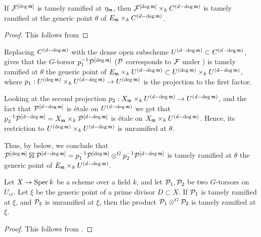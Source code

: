 \begin{lemma}\label{lemma:tame_ramification_persists}
     If $\mathcal{F}^{[\deg \mathfrak{m}]}$ is tamely ramified at $\eta_{\mathfrak{m}}$, then
     $\mathcal{F}^{[\deg \mathfrak{m}]} \times_k C^{(d-\deg \mathfrak{m})}$ is tamely ramified at the generic point $\theta$ of
     $E_{\mathfrak{m}} \times_k C^{(d-\deg \mathfrak{m})}$.
\end{lemma}
\begin{proof}
    This follows from 
\end{proof}


Replacing $C^{(d - \deg \mathfrak{m})}$ with the dense open subscheme $U^{(d - \deg \mathfrak{m})} \subset C^{(d - \deg \mathfrak{m})}$,
 gives that the $G$-torsor $p_1^{-1} \mathcal{P}^{[\deg \mathfrak{m}]}$ ($\mathcal{P}$ corresponds to $\mathcal{F}$ under )
is tamely ramified at $\theta$ the generic point of
$E_{\mathfrak{m}} \times_k U^{(d-\deg \mathfrak{m})} \subset U^{(\deg \mathfrak{m})} \times_k U^{(d - \deg \mathfrak{m})}$,
where $p_1: U^{(\deg \mathfrak{m})} \times_k U^{(d - \deg \mathfrak{m})} \to U^{(\deg \mathfrak{m})}$ is the projection to the first factor.

Looking at the second projection $p_2:X_{\mathfrak{m}} \times_k U^{(d - \deg \mathfrak{m})} \to U^{(d - \deg \mathfrak{m})}$, and the fact that
$\mathcal{P}^{[d - \deg \mathfrak{m}]}$ is \'etale on $U^{(d - \deg \mathfrak{m})}$ we get that
$p_2^{-1} \mathcal{P}^{[d - \deg \mathfrak{m}]}= X_{\mathfrak{m}} \times_k \mathcal{P}^{[d - \deg \mathfrak{m}]}$ is \'etale on $X_{\mathfrak{m}} \times_k U^{(d - \deg \mathfrak{m})}$.
Hence, its restriction to $U^{(\deg \mathfrak{m})} \times_k U^{(d - \deg \mathfrak{m})}$ is unramified at $\theta$.

Thus, by  below, we conclude that ${\mathcal{P}^{[\deg \mathfrak{m}]}} \boxtimes \mathcal{P}^{[d - \deg \mathfrak{m}]} = p_1^{-1} \mathcal{P}^{[\deg \mathfrak{m}]} \otimes^G p_2^{-1} \mathcal{P}^{[d - \deg \mathfrak{m}]}$
     is tamely ramified at $\theta$ the generic point of $E_{\mathfrak{m}} \times_k U^{(d-\deg \mathfrak{m})}$.

\begin{lemma}\label{lemma:tame_times_unramified}
     Let $X \to \operatorname{Spec} k$ be a scheme over a field $k$, and let $\mathcal{P}_1, \mathcal{P}_2$ be two $G$-torsors on $U_{et}$.
     Let $\xi$ be the generic point of a prime divisor $D \subset X$.
     If $\mathcal{P}_1$ is tamely ramified at $\xi$, and $\mathcal{P}_2$ is unramified at $\xi$,
     then the product $\mathcal{P}_1 \otimes^G \mathcal{P}_2$ is tamely ramified at $\xi$.
\end{lemma}
\begin{proof}
     This follows from .
\end{proof}


